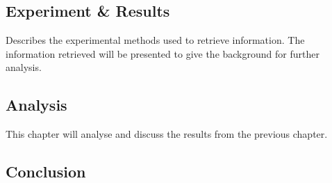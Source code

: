 \subsection{Experiment \& Results}
Describes the experimental methods used to retrieve information. The information retrieved will be presented to give the background for further analysis. 

\subsection{Analysis}
This chapter will analyse and discuss the results from the previous chapter.

\subsection{Conclusion}




\cleardoublepage